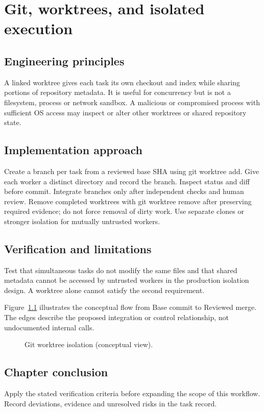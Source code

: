 \chapter{Git, worktrees, and isolated execution}

\section{Engineering principles}

A linked worktree gives each task its own checkout and index while sharing portions of repository metadata. It is useful for concurrency but is not a filesystem, process or network sandbox. A malicious or compromised process with sufficient OS access may inspect or alter other worktrees or shared repository state.

\section{Implementation approach}

Create a branch per task from a reviewed base SHA using git worktree add. Give each worker a distinct directory and record the branch. Inspect status and diff before commit. Integrate branches only after independent checks and human review. Remove completed worktrees with git worktree remove after preserving required evidence; do not force removal of dirty work. Use separate clones or stronger isolation for mutually untrusted workers.

\section{Verification and limitations}

Test that simultaneous tasks do not modify the same files and that shared metadata cannot be accessed by untrusted workers in the production isolation design. A worktree alone cannot satisfy the second requirement.

Figure~\ref{fig:d16} illustrates the conceptual flow from Base commit to Reviewed merge. The edges describe the proposed integration or control relationship, not undocumented internal calls.

\begin{figure}[htbp]\centering\caption{Git worktree isolation (conceptual view).}\label{fig:d16}\end{figure}

\section{Chapter conclusion}

Apply the stated verification criteria before expanding the scope of this workflow. Record deviations, evidence and unresolved risks in the task record.
